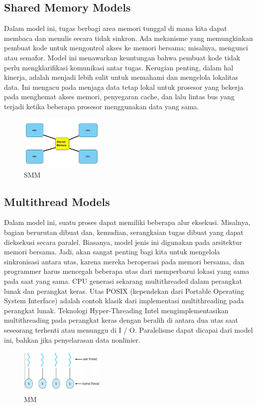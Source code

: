 \subsection{Shared Memory Models}
\hfill\break
Dalam model ini, tugas berbagi area memori tunggal di mana kita dapat membaca dan menulis secara tidak sinkron. Ada mekanisme yang memungkinkan pembuat kode untuk mengontrol akses ke memori bersama; misalnya, mengunci atau semafor. Model ini menawarkan keuntungan bahwa pembuat kode tidak perlu mengklarifikasi komunikasi antar tugas. Kerugian penting, dalam hal kinerja, adalah menjadi lebih sulit untuk memahami dan mengelola lokalitas data. Ini mengacu pada menjaga data tetap lokal untuk prosesor yang bekerja pada menghemat akses memori, penyegaran cache, dan lalu lintas bus yang terjadi ketika beberapa prosesor menggunakan data yang sama.
 \begin{figure}[H]
        \includegraphics[width=4cm]{figures/kelompok3/1/dwi11.PNG}
        \centering
        \caption{SMM}
\end{figure}
\hfill\break
\subsection{Multithread Models}
\hfill\break
Dalam model ini, suatu proses dapat memiliki beberapa alur eksekusi. Misalnya, bagian berurutan dibuat dan, kemudian, serangkaian tugas dibuat yang dapat dieksekusi secara paralel. Biasanya, model jenis ini digunakan pada arsitektur memori bersama. Jadi, akan sangat penting bagi kita untuk mengelola sinkronisasi antara utas, karena mereka beroperasi pada memori bersama, dan programmer harus mencegah beberapa utas dari memperbarui lokasi yang sama pada saat yang sama. CPU generasi sekarang multithreaded dalam perangkat lunak dan perangkat keras. Utas POSIX (kependekan dari Portable Operating System Interface) adalah contoh klasik dari implementasi multithreading pada perangkat lunak. Teknologi Hyper-Threading Intel mengimplementasikan multithreading pada perangkat keras dengan beralih di antara dua utas saat seseorang terhenti atau menunggu di I / O. Paralelisme dapat dicapai dari model ini, bahkan jika penyelarasan data nonlinier.
 \begin{figure}[H]
        \includegraphics[width=4cm]{figures/kelompok3/1/dwi3.PNG}
        \centering
        \caption{MM}
\end{figure}
\hfill\break
